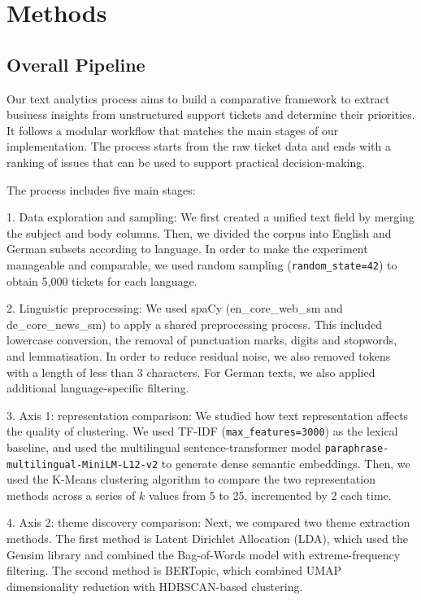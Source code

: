 \documentclass[11pt]{article}
\begin{document}
\section{Methods}

\subsection{Overall Pipeline}

Our text analytics process aims to build a comparative framework to extract business insights from unstructured support tickets and determine their priorities. It follows a modular workflow that matches the main stages of our implementation. The process starts from the raw ticket data and ends with a ranking of issues that can be used to support practical decision-making.

The process includes five main stages:

1. Data exploration and sampling: We first created a unified text field by merging the subject and body columns. Then, we divided the corpus into English and German subsets according to language. In order to make the experiment manageable and comparable, we used random sampling (\texttt{random\_state=42}) to obtain 5,000 tickets for each language.

2. Linguistic preprocessing: We used spaCy (en\_core\_web\_sm and de\_core\_news\_sm) to apply a shared preprocessing process. This included lowercase conversion, the removal of punctuation marks, digits and stopwords, and lemmatisation. In order to reduce residual noise, we also removed tokens with a length of less than 3 characters. For German texts, we also applied additional language-specific filtering.

3. Axis 1: representation comparison: We studied how text representation affects the quality of clustering. We used TF-IDF (\texttt{max\_features=3000}) as the lexical baseline, and used the multilingual sentence-transformer model \texttt{paraphrase-multilingual-MiniLM-L12-v2} \citep{huggingface_minilm_l12_v2} to generate dense semantic embeddings. Then, we used the K-Means clustering algorithm to compare the two representation methods across a series of $k$ values from 5 to 25, incremented by 2 each time.

4. Axis 2: theme discovery comparison: Next, we compared two theme extraction methods. The first method is Latent Dirichlet Allocation (LDA), which used the Gensim library and combined the Bag-of-Words model with extreme-frequency filtering. The second method is BERTopic, which combined UMAP dimensionality reduction with HDBSCAN-based clustering.
\end{document}
